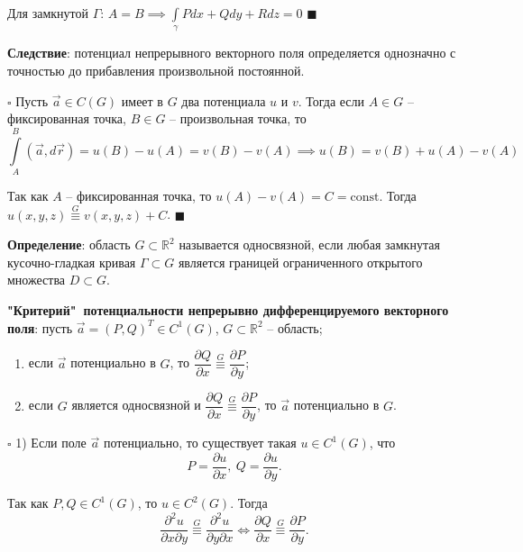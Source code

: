 \documentclass[12pt, a4paper, reqno]{article}
\begin{document}
    Для замкнутой $\Gamma$: $A = B \implies \int\limits_{\gamma} Pdx + Qdy + Rdz = 0$
    $\blacksquare$

    \textbf{Следствие}: потенциал непрерывного векторного поля определяется однозначно с точностью
    до прибавления произвольной постоянной.

    $\square$
    Пусть $\vec{a} \in C(G)$ имеет в $G$ два потенциала $u$ и $v$. Тогда если $A \in G$ -- фиксированная
    точка, $B \in G$ -- произвольная точка, то
    \begin{equation*}
        \int\limits_{A}^{B} (\vec{a}, d\vec{r}) = u(B) - u(A) = v(B) - v(A) \implies
        u(B) = v(B) + u(A) - v(A)
    \end{equation*}

    Так как $A$ -- фиксированная точка, то $u(A) - v(A) = C = \text{const}$. Тогда
    $u(x, y, z) \overset{G}{\equiv} v(x, y, z) + C$.
    $\blacksquare$

    \textbf{Определение}: область $G \subset \mathbb{R}^2$ называется
    \hypertarget{simply-connected}{односвязной}, если любая замкнутая кусочно-гладкая кривая
    $\Gamma \subset G$ является границей ограниченного открытого множества $D \subset G$.

    \textbf{"Критерий"\ потенциальности непрерывно дифференцируемого векторного поля}: пусть
    $\vec{a} = (P, Q)^T \in C^1(G)$, $G \subset \mathbb{R}^2$ -- область;
    \begin{enumerate}
        \item если $\vec{a}$ потенциально в $G$, то
              $\dfrac{\partial Q}{\partial x} \overset{G}{\equiv} \dfrac{\partial P}{\partial y}$;
        \item если $G$ является односвязной и
              $\dfrac{\partial Q}{\partial x} \overset{G}{\equiv} \dfrac{\partial P}{\partial y}$,
              то $\vec{a}$ потенциально в $G$.
    \end{enumerate}

    $\square$
    1) Если поле $\vec{a}$ потенциально, то существует такая $u \in C^1(G)$, что
    \begin{equation*}
        P = \frac{\partial u}{\partial x},\ Q = \frac{\partial u}{\partial y}.
    \end{equation*}

    Так как $P, Q \in C^1(G)$, то $u \in C^2(G)$. Тогда
    \begin{equation*}
        \frac{\partial^2 u}{\partial x \partial y} \overset{G}{\equiv}
        \frac{\partial^2 u}{\partial y \partial x} \iff
        \frac{\partial Q}{\partial x} \overset{G}{\equiv} \frac{\partial P}{\partial y}.
    \end{equation*}
\end{document}
